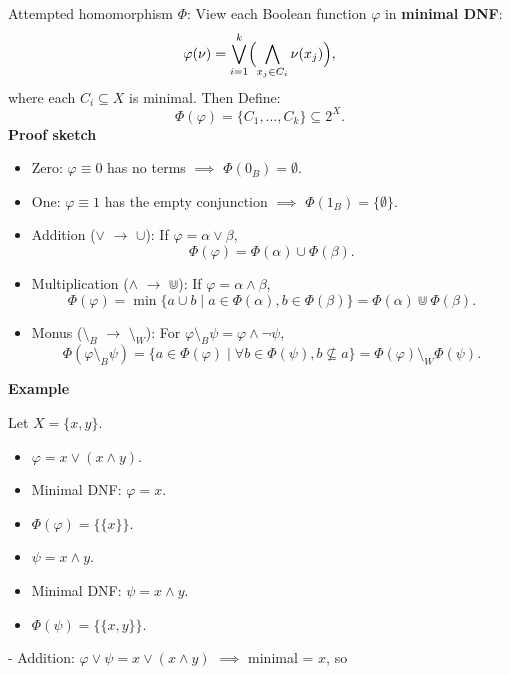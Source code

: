 Attempted homomorphism \(\Phi\):
View each Boolean function \(\varphi\) in \textbf{minimal DNF}:
   \[
   \varphi(\nu)
   = \bigvee_{i=1}^k \Bigl(\bigwedge_{x_j\in C_i} \nu(x_j)\Bigr),
   \]
   where each \(C_i\subseteq X\) is minimal.\newline
Then Define:
   \[
   \Phi(\varphi) = \{C_1,\dots,C_k\}\subseteq 2^X.
   \]
\textbf{Proof sketch}
\begin{itemize}
\item Zero:  
   \(\varphi\equiv 0\) has no terms $\implies$ \(\Phi(0_B)=\emptyset\).

\item One:  
   \(\varphi\equiv 1\) has the empty conjunction $\implies$ \(\Phi(1_B)=\{\emptyset\}\).

\item Addition (\(\vee\) $\rightarrow$ \(\cup\)):  
   If \(\varphi=\alpha\vee\beta\),
   \[
   \Phi(\varphi) = \Phi(\alpha)\cup\Phi(\beta).
   \]

\item Multiplication (\(\wedge\) $\rightarrow$  \(\Cup\)):  
   If \(\varphi=\alpha\wedge\beta\),
   \[
   \Phi(\varphi)
   = \min\{a\cup b\mid a\in\Phi(\alpha),b\in\Phi(\beta)\}
   = \Phi(\alpha)\Cup\Phi(\beta).
   \]

\item Monus (\(\setminus_B\) $\rightarrow$  \(\setminus_W\)):  
   For \(\varphi\setminus_B\psi = \varphi\wedge\neg\psi\),
   \[
   \Phi(\varphi\setminus_B\psi)
   = \{a\in\Phi(\varphi)\mid \forall b\in\Phi(\psi),b\nsubseteq a\}
   = \Phi(\varphi)\setminus_W\Phi(\psi).
   \]

\end{itemize}


\textbf{Example}

Let \(X=\{x,y\}\).
\begin{itemize}
    \item \(\varphi = x \vee (x\wedge y)\).  
    \item Minimal DNF: \(\varphi = x\).
    \item \(\Phi(\varphi) = \{\{x\}\}\).
    \item \(\psi = x\wedge y\).  
    \item Minimal DNF: \(\psi = x\wedge y\).
    \item \(\Phi(\psi) = \{\{x,y\}\}\).
\end{itemize}

- Addition:  
  \(\varphi \vee \psi = x \vee (x\wedge y)\) $\implies$ minimal = \(x\), so


